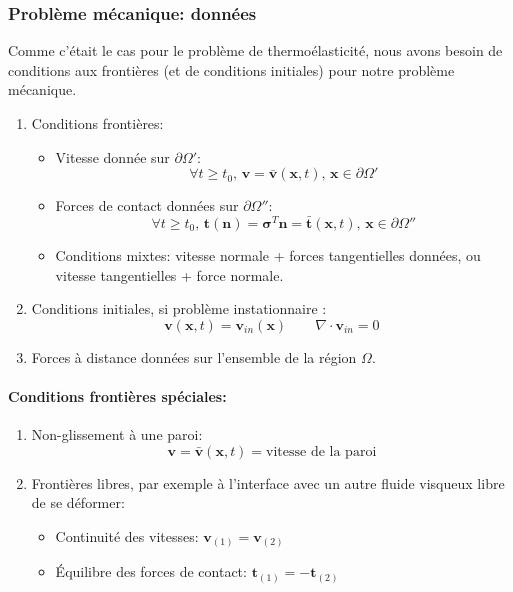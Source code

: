\subsubsection*{Problème mécanique: données}
Comme c'était le cas pour le problème de thermoélasticité, nous avons besoin de conditions aux frontières (et de conditions initiales) pour notre problème mécanique.
\begin{enumerate}
\item Conditions frontières:
	\begin{itemize}
	\item Vitesse donnée sur $\partial \Omega'$:
	 $$\forall t \geq t_0,\,\textbf{v}=\bar{\textbf{v}}(\textbf{x},t),\, \textbf{x}\in \partial \Omega'$$
	\item Forces de contact données sur $\partial\Omega''$:
	 $$\forall t \geq t_0,\,\textbf{t}(\textbf{n})=\boldsymbol{\sigma}^T\textbf{n}=\bar{\textbf{t}}(\textbf{x},t),\, \textbf{x}\in \partial \Omega''$$
	 \item Conditions mixtes: vitesse normale + forces tangentielles données, ou vitesse tangentielles + force normale. 
	\end{itemize}
\item Conditions initiales, si problème instationnaire :
 $$\textbf{v}(\textbf{x},t)=\textbf{v}_{in}(\textbf{x})\qquad\nabla\cdot\textbf{v}_{in}=0$$
 \item Forces à distance données sur l'ensemble de la région $\Omega$.
\end{enumerate}
\paragraph{Conditions frontières spéciales: }

\begin{enumerate}
\item Non-glissement à une paroi: $$\textbf{v}=\bar{\textbf{v}}(\textbf{x},t)=\text{vitesse de la paroi}$$
\item Frontières libres, par exemple à l'interface avec un autre fluide visqueux libre de se déformer:
	\begin{itemize}
	\item Continuité des vitesses: $\textbf{v}_{(1)}=\textbf{v}_{(2)}$
	\item \'Equilibre des forces de contact: $\textbf{t}_{(1)}=-\textbf{t}_{(2)}$
	\end{itemize}
\end{enumerate}

